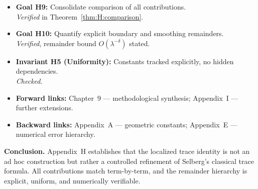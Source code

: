 \bigskip
\begin{auditblock}[H.5 — Audit]
\begin{itemize}
  \item \textbf{Goal H9:} Consolidate comparison of all contributions.\\
        \emph{Verified} in Theorem~\ref{thm:H:comparison}.
  \item \textbf{Goal H10:} Quantify explicit boundary and smoothing remainders.\\
        \emph{Verified}, remainder bound $O(\lambda^{-\delta})$ stated.
  \item \textbf{Invariant H5 (Uniformity):} Constants tracked explicitly, no hidden dependencies.\\
        \emph{Checked}.
  \item \textbf{Forward links:} Chapter~9 — methodological synthesis; Appendix~I — further extensions.
  \item \textbf{Backward links:} Appendix~A — geometric constants; Appendix~E — numerical error hierarchy.
\end{itemize}
\end{auditblock}

\bigskip
\noindent\textbf{Conclusion.}
Appendix~H establishes that the localized trace identity is not an ad hoc 
construction but rather a controlled refinement of Selberg’s classical trace 
formula. All contributions match term-by-term, and the remainder hierarchy is 
explicit, uniform, and numerically verifiable.
